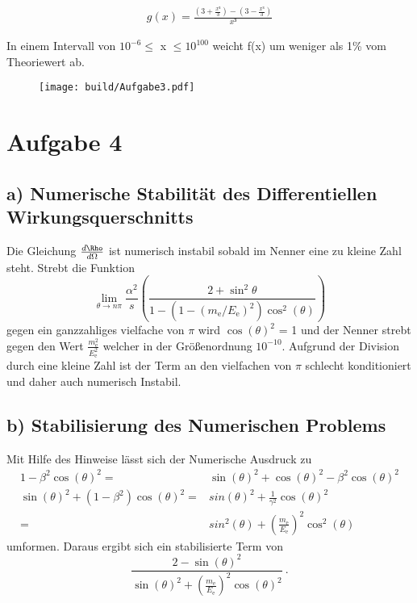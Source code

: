 \begin{align*}
	g(x) = \frac{(3 + \frac{x³}{3}) - (3 - \frac{x³}{3})}{x³}
\end{align*}

In einem Intervall von $10^{-6} \le$ x $\le 10^{100}$ weicht f(x) um weniger als 1\% vom Theoriewert ab. \\

\begin{figure}
	\centering
	\texttt{[image: build/Aufgabe3.pdf]}
\end{figure}
\section{Aufgabe 4}
\subsection{a) Numerische Stabilität des Differentiellen Wirkungsquerschnitts}
Die Gleichung $\frac{d\Rho}{d\Omega}$ ist numerisch instabil sobald im Nenner eine zu kleine Zahl steht. Strebt die Funktion 
\begin{equation}
  \lim\limits_{\theta \to n\pi} \frac{\alpha^2}{s} \left( \frac{2+\sin^2{\theta}}{1-(1-(m_\text{e}/E_\text{e})^2) \cos^2(\theta)} \right)
  \label{eqn:wirk}
\end{equation}
gegen ein ganzzahliges vielfache von $\pi$ wird $\cos(\theta)^2$ =  1 und der Nenner strebt gegen den Wert $\frac{m_\text{e}^2}{E_\text{e}^2}$ welcher in der Größenordnung $10^{-10}$. Aufgrund der Division durch eine kleine Zahl ist der Term an den vielfachen von $\pi$ schlecht konditioniert und daher auch numerisch Instabil.
\subsection{b) Stabilisierung des Numerischen Problems}
Mit Hilfe des Hinweise lässt sich der Numerische Ausdruck zu 
\begin{eqnarray}
  1 -\beta^2 \cos(\theta)^2 =& \sin(\theta)^2 + \cos(\theta)^2 -\beta^2 \cos(\theta)^2 \\
  \sin(\theta)^2 + (1 - \beta^2) \cos(\theta)^2 =& sin(\theta)^2 + \frac{1}{\gamma^2} \cos(\theta)^2 \\
 =& sin^2(\theta) + \left( \frac{m_\text{e}}{E_\text{e}} \right)^2 \cos^2(\theta)
  \label{<++>}
\end{eqnarray}
umformen. Daraus ergibt sich ein stabilisierte Term von 
\begin{equation}
  \frac{2 - \sin(\theta)^2}{\sin(\theta)^2 + (\frac{m_\text{e}}{E_\text{e}})^2 \cos(\theta)^2} \ .
  \label{}
\end{equation}
